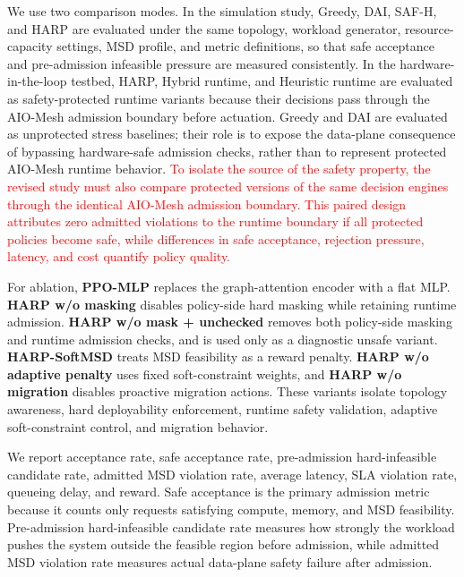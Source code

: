 \documentclass[final,5p]{elsarticle}
\newcommand{\rev}[1]{\textcolor{red}{#1}}
\begin{document}
We use two comparison modes. In the simulation study, Greedy, DAI, SAF-H, and HARP are evaluated under the same topology, workload generator, resource-capacity settings, MSD profile, and metric definitions, so that safe acceptance and pre-admission infeasible pressure are measured consistently. In the hardware-in-the-loop testbed, HARP, Hybrid runtime, and Heuristic runtime are evaluated as safety-protected runtime variants because their decisions pass through the AIO-Mesh admission boundary before actuation. Greedy and DAI are evaluated as unprotected stress baselines; their role is to expose the data-plane consequence of bypassing hardware-safe admission checks, rather than to represent protected AIO-Mesh runtime behavior. \rev{To isolate the source of the safety property, the revised study must also compare protected versions of the same decision engines through the identical AIO-Mesh admission boundary. This paired design attributes zero admitted violations to the runtime boundary if all protected policies become safe, while differences in safe acceptance, rejection pressure, latency, and cost quantify policy quality.}

For ablation, \textbf{PPO-MLP} replaces the graph-attention encoder with a flat MLP. \textbf{HARP w/o masking} disables policy-side hard masking while retaining runtime admission. \textbf{HARP w/o mask + unchecked} removes both policy-side masking and runtime admission checks, and is used only as a diagnostic unsafe variant. \textbf{HARP-SoftMSD} treats MSD feasibility as a reward penalty. \textbf{HARP w/o adaptive penalty} uses fixed soft-constraint weights, and \textbf{HARP w/o migration} disables proactive migration actions. These variants isolate topology awareness, hard deployability enforcement, runtime safety validation, adaptive soft-constraint control, and migration behavior.

We report acceptance rate, safe acceptance rate, pre-admission hard-infeasible candidate rate, admitted MSD violation rate, average latency, SLA violation rate, queueing delay, and reward. Safe acceptance is the primary admission metric because it counts only requests satisfying compute, memory, and MSD feasibility. Pre-admission hard-infeasible candidate rate measures how strongly the workload pushes the system outside the feasible region before admission, while admitted MSD violation rate measures actual data-plane safety failure after admission.
\end{document}
